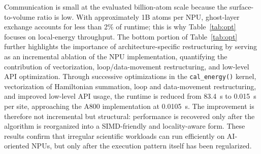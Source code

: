 \documentclass{article}
\newcommand{\rev}[1]{#1}
\begin{document}
\rev{Communication is small at the evaluated billion-atom scale because the surface-to-volume ratio is low. With approximately 1B atoms per NPU, ghost-layer exchange accounts for less than 2\% of runtime; this is why Table~\ref{tab:opt} focuses on local-energy throughput.} The bottom portion of Table~\ref{tab:opt} further highlights the importance of architecture-specific restructuring by serving as an incremental ablation of the NPU implementation, quantifying the contribution of vectorization, loop/data-movement restructuring, and low-level API optimization. Through successive optimizations in the \texttt{cal\_energy()} kernel, vectorization of Hamiltonian summation, loop and data-movement restructuring, and improved low-level API usage, the runtime is reduced from 83.4~s to 0.015~s per site, approaching the A800 implementation at 0.0105~s. The improvement is therefore not incremental but structural: performance is recovered only after the algorithm is reorganized into a SIMD-friendly and locality-aware form. These results confirm that irregular scientific workloads can run efficiently on AI-oriented NPUs, but only after the execution pattern itself has been regularized.
\end{document}
